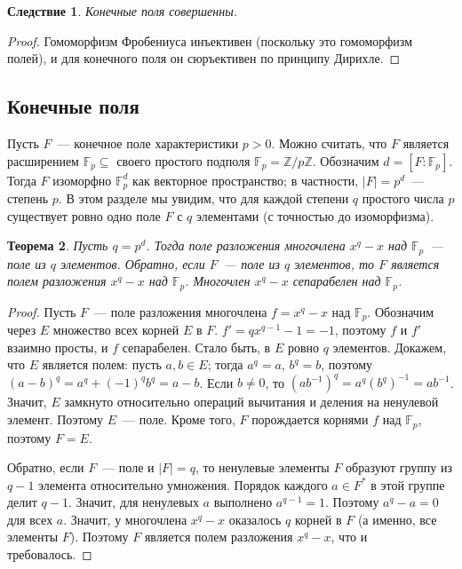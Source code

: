 \documentclass[a4paper,11pt]{scrartcl}
\theoremstyle{plain}
\newtheorem{theorem}{Теорема}[subsection]
\newtheorem{corollary}[theorem]{Следствие}
\theoremstyle{definition}
\newcommand\mb{\mathbb}
\newcommand\sseq{\subseteq}
\begin{document}
\begin{corollary}
Конечные поля совершенны.
\end{corollary}
\begin{proof}
Гомоморфизм Фробениуса инъективен (поскольку это гомоморфизм полей), и
для конечного поля он сюръективен по принципу Дирихле.
\end{proof}

\subsection{Конечные поля}\label{ssect:finite-fields}

Пусть $F$~--- конечное поле характеристики $p>0$. Можно считать, что
$F$ является расширением $\mb F_p\sseq$ своего простого подполя $\mb
F_p=\mb Z/p\mb Z$. Обозначим $d=[F:\mb F_p]$. Тогда $F$ изоморфно $\mb
F_p^d$ как векторное пространство; в частности, $|F|=p^d$~--- степень
$p$. В этом разделе мы увидим, что для каждой степени $q$ простого
числа $p$ существует ровно одно поле $F$ с $q$ элементами (с точностью
до изоморфизма).

\begin{theorem}\label{thm_finite_fields}
Пусть $q=p^d$. Тогда поле разложения многочлена $x^q-x$ над $\mb
F_p$~--- поле из $q$ элементов. Обратно, если $F$~--- поле из $q$
элементов, то $F$ является полем разложения $x^q-x$ над $\mb
F_p$. Многочлен $x^q-x$ сепарабелен над $\mb F_p$.
\end{theorem}
\begin{proof}
Пусть $F$~--- поле разложения многочлена $f=x^q-x$ над $\mb
F_p$. Обозначим через
$E$ множество всех корней $E$ в $F$. $f'=qx^{q-1}-1=-1$, поэтому $f$ и
$f'$ взаимно просты, и $f$ сепарабелен. Стало быть, в $E$ ровно $q$
элементов. Докажем, что $E$ является полем: пусть $a,b\in E$; тогда
$a^q=a$, $b^q=b$, поэтому $(a-b)^q=a^q+(-1)^qb^q=a-b$. Если $b\neq 0$,
то $(ab^{-1})^q=a^q(b^q)^{-1}=ab^{-1}$. Значит, $E$ замкнуто
относительно операций вычитания и деления на ненулевой
элемент. Поэтому $E$~--- поле. Кроме того, $F$ порождается корнями $f$
над $\mb F_p$, поэтому $F=E$.

Обратно, если $F$~--- поле и $|F|=q$, то ненулевые элементы $F$
образуют группу из $q-1$ элемента относительно умножения. Порядок
каждого $a\in F^*$ в этой группе делит $q-1$. Значит, для ненулевых
$a$ выполнено $a^{q-1}=1$. Поэтому $a^q-a=0$ для всех $a$. Значит, у
многочлена $x^q-x$ оказалось $q$ корней в $F$ (а именно, все элементы
$F$). Поэтому $F$ является полем разложения $x^q-x$, что и требовалось.
\end{proof}
\end{document}
